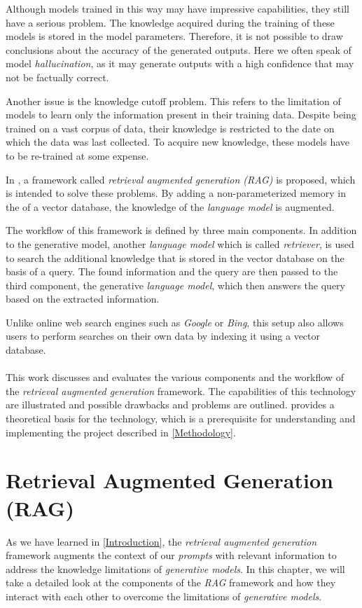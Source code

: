 \documentclass{article}
\begin{document}
Although models trained in this way may have impressive capabilities, they still have a serious problem. The knowledge acquired during the training of these models is stored in the model parameters\cite{RAG}. Therefore, it is not possible to draw conclusions about the accuracy of the generated outputs. Here we often speak of model \textit{hallucination}, as it may generate outputs with a high confidence that may not be factually correct.

Another issue is the knowledge cutoff problem. This refers to the limitation of models to learn only the information present in their training data.   Despite being trained on a vast corpus of data, their knowledge is restricted to the date on which the data was last collected. To acquire new knowledge, these models have to be re-trained at some expense.

In \cite{RAG}, a framework called \textit{retrieval augmented generation (RAG)} is proposed, which is intended to solve these problems. By adding a non-parameterized memory in the of a vector database, the knowledge of the \textit{language model} is augmented. 

The workflow of this framework is defined by three main components. In addition to the generative model, another \textit{language model} which is called \textit{retriever}, is used to search the additional knowledge that is stored in the vector database on the basis of a query. The found information and the query are then passed to the third component, the generative \textit{language model}, which then answers the query based on the extracted information.

Unlike online web search engines such as \textit{Google} or \textit{Bing}, this setup also allows users to perform searches on their own data by indexing it using a vector database. 
\\
\\
This work discusses and evaluates the various components and the workflow of the \textit{retrieval augmented generation} framework. The capabilities of this technology are illustrated and possible drawbacks and problems are outlined.
 provides a theoretical basis for the technology, which is a prerequisite for understanding and implementing the project described in \cref{Methodology}.

\section{Retrieval Augmented Generation (RAG)} \label{RAG}
As we have learned in \cref{Introduction}, the \textit{retrieval augmented generation} framework augments the context of our \textit{prompts} with relevant information to address the knowledge limitations of \textit{generative models}.
In this chapter, we will take a detailed look at the components of the \textit{RAG} framework and how they interact with each other to overcome the limitations of \textit{generative models}.
\end{document}
